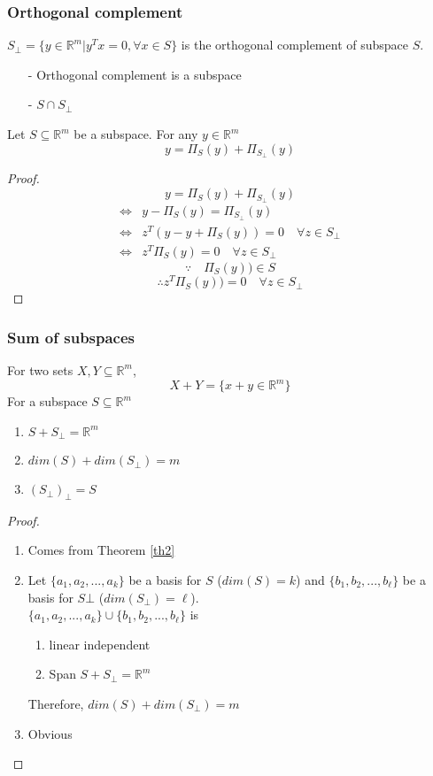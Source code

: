 \begin{multicols}{2}
\subsubsection{Orthogonal complement}
$S_\bot =\{y\in\mathbb{R}^m|y^Tx=0,\forall x\in S\}$ is the orthogonal complement 
of subspace $S$. 
\begin{itemize}
    \item [-] Orthogonal complement is a subspace
    \item [-] $S \cap S_\bot$
\end{itemize}
\begin{theorem} \label{th2}
    
    Let $S\subseteq \mathbb{R}^m$ be a subspace. For any $y\in\mathbb{R}^m$
    \[
        y=\Pi_S(y) + \Pi_{S_\bot}(y)
    \]
\end{theorem}
\begin{proof}
    \[
        y=\Pi_S(y) + \Pi_{S_\bot}(y)
    \]
    \[
        \begin{array}{ll}
            \Longleftrightarrow & y-\Pi_S(y)=\Pi_{S_\bot}(y) \\
            \Longleftrightarrow & z^T(y-y+\Pi_S(y))=0 \quad \forall z\in S_\bot \\
            \Longleftrightarrow & z^T\Pi_S(y)=0 \quad \forall z\in S_\bot 
        \end{array}
    \]
    \[
        \because\quad \Pi_S(y))\in S 
    \]
    \[
        \therefore z^T\Pi_S(y))=0 \quad \forall z\in S_\bot 
    \]
\end{proof}

\subsubsection{Sum of subspaces}
For two sets $X,Y\subseteq \mathbb{R}^m$,
\[
    X+Y=\{x+y\in\mathbb{R}^m\}
\]
For a subspace $S\subseteq \mathbb{R}^m$
\begin{enumerate}
    \item $S+S_\bot = \mathbb{R}^m$
    \item $dim(S)+dim(S_\bot)=m$
    \item $(S_\bot)_\bot = S$
\end{enumerate}
\begin{proof}
    \begin{enumerate}
        \item Comes from Theorem \ref{th2}
        \item Let $\{a_1,a_2,...,a_k\}$ be a basis for $S$ ($dim(S)=k$) and $\{b_1,b_2,...,b_\ell\}$ be a basis for $S\bot$ ($dim(S_\bot)=\ell$).
        \\ $\{a_1,a_2,...,a_k\}\cup\{b_1,b_2,...,b_\ell\}$ is 
        \begin{enumerate}
            \item linear independent
            \item Span $S+S_\bot=\mathbb{R}^m$
        \end{enumerate}
        Therefore, $dim(S)+dim(S_\bot)=m$
        \item Obvious
    \end{enumerate}
\end{proof}


\end{multicols}
